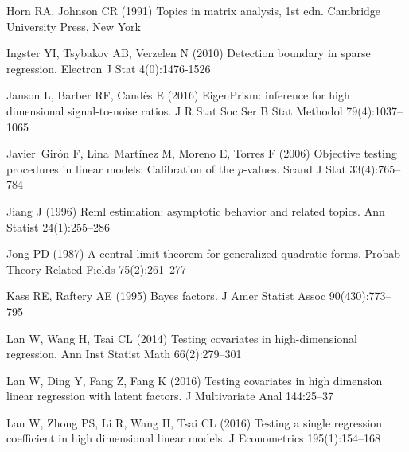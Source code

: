 \documentclass[smallextended]{svjour3}       %
\begin{document}
\begin{thebibliography}{}
Horn RA, Johnson CR (1991) Topics in matrix analysis, 1st edn. Cambridge
  University Press, New York

    Ingster YI, Tsybakov AB, Verzelen N (2010) Detection boundary in sparse regression. Electron J Stat 4(0):1476-1526


Janson L, Barber RF, Cand{\`{e}}s E (2016) {EigenPrism}: inference for high
  dimensional signal-to-noise ratios. J R Stat Soc Ser B Stat Methodol 79(4):1037--1065


Javier~Gir\'on F, Lina~Mart\'inez M, Moreno E, Torres F (2006) Objective
  testing procedures in linear models: Calibration of the $p$-values.
  Scand J Stat 33(4):765--784

Jiang J (1996) Reml estimation: asymptotic behavior and related topics. Ann Statist 24(1):255--286

Jong PD (1987) A central limit theorem for generalized quadratic forms.
  Probab Theory Related Fields 75(2):261--277

Kass RE, Raftery AE (1995) Bayes factors. J Amer Statist Assoc 90(430):773--795

Lan W, Wang H, Tsai CL (2014) Testing covariates in high-dimensional
  regression. Ann Inst Statist Math 66(2):279--301

Lan W, Ding Y, Fang Z, Fang K (2016{}) Testing covariates in high
  dimension linear regression with latent factors. J Multivariate
  Anal 144:25--37

Lan W, Zhong PS, Li R, Wang H, Tsai CL (2016{}) Testing a single
  regression coefficient in high dimensional linear models. J Econometrics 195(1):154--168


\end{thebibliography}
\end{document}
